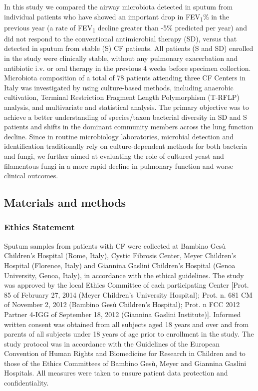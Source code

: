 In this study we compared the airway microbiota detected in sputum from individual patients who have showed an important drop in FEV\textsubscript{1}\% in the previous year (a rate of FEV\textsubscript{1} decline greater than -5\% predicted per year) and did not respond to the conventional antimicrobial therapy (SD), versus that detected in sputum from stable (S) CF patients. All patients (S and SD) enrolled in the study were clinically stable, without any pulmonary exacerbation and antibiotic i.v. or oral therapy in the previous 4 weeks before specimen collection. Microbiota composition of a total of 78 patients attending three CF Centers in Italy was investigated by using culture-based methods, including anaerobic cultivation, Terminal Restriction Fragment Length Polymorphism (T-RFLP) analysis, and multivariate and statistical analysis. The primary objective was to achieve a better understanding of species/taxon bacterial diversity in SD and S patients and shifts in the dominant community members across the lung function decline. Since in routine microbiology laboratories, microbial detection and identification traditionally rely on culture-dependent methods for both bacteria and fungi, we further aimed at evaluating the role of  cultured yeast and filamentous fungi in a more rapid decline in pulmonary function and worse clinical outcomes.\\

\subsection{Materials and methods}

\subsubsection{Ethics Statement}
Sputum samples from patients with CF were collected at Bambino Ges\`u Children's Hospital (Rome, Italy), Cystic Fibrosis Center, Meyer Children's Hospital (Florence, Italy) and Giannina Gaslini Children's Hospital (Genoa University, Genoa, Italy), in accordance with the ethical guidelines. The study was approved by the local Ethics Committee of each participating Center [Prot. 85 of February 27, 2014 (Meyer Children's University Hospital); Prot. n. 681 CM of November 2, 2012 (Bambino Ges\`u Children's Hospital); Prot. n FCC 2012 Partner 4-IGG of September 18, 2012 (Giannina Gaslini Institute)]. Informed written consent was obtained from all subjects aged 18 years and over and from parents of all subjects under 18 years of age prior to enrollment in the study. The study protocol was in accordance with the Guidelines of the European Convention of Human Rights and Biomedicine for Research in Children and to those of the Ethics Committees of Bambino Ges\`u, Meyer and Giannina Gaslini Hospitals. All measures were taken to ensure patient data protection and confidentiality.\\

